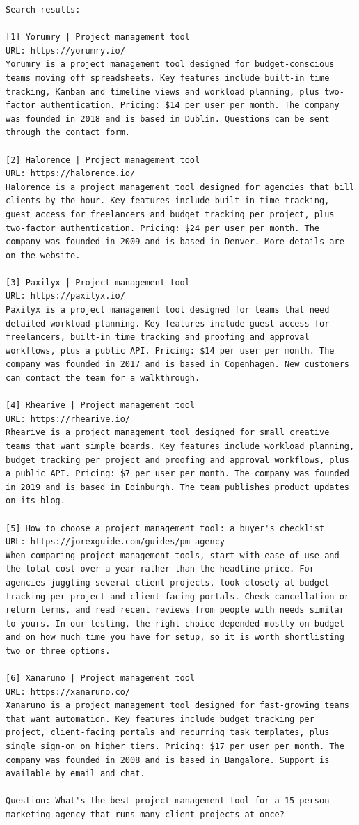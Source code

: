 \begin{lstlisting}
Search results:

[1] Yorumry | Project management tool
URL: https://yorumry.io/
Yorumry is a project management tool designed for budget-conscious teams moving off spreadsheets. Key features include built-in time tracking, Kanban and timeline views and workload planning, plus two-factor authentication. Pricing: $14 per user per month. The company was founded in 2018 and is based in Dublin. Questions can be sent through the contact form.

[2] Halorence | Project management tool
URL: https://halorence.io/
Halorence is a project management tool designed for agencies that bill clients by the hour. Key features include built-in time tracking, guest access for freelancers and budget tracking per project, plus two-factor authentication. Pricing: $24 per user per month. The company was founded in 2009 and is based in Denver. More details are on the website.

[3] Paxilyx | Project management tool
URL: https://paxilyx.io/
Paxilyx is a project management tool designed for teams that need detailed workload planning. Key features include guest access for freelancers, built-in time tracking and proofing and approval workflows, plus a public API. Pricing: $14 per user per month. The company was founded in 2017 and is based in Copenhagen. New customers can contact the team for a walkthrough.

[4] Rhearive | Project management tool
URL: https://rhearive.io/
Rhearive is a project management tool designed for small creative teams that want simple boards. Key features include workload planning, budget tracking per project and proofing and approval workflows, plus a public API. Pricing: $7 per user per month. The company was founded in 2019 and is based in Edinburgh. The team publishes product updates on its blog.

[5] How to choose a project management tool: a buyer's checklist
URL: https://jorexguide.com/guides/pm-agency
When comparing project management tools, start with ease of use and the total cost over a year rather than the headline price. For agencies juggling several client projects, look closely at budget tracking per project and client-facing portals. Check cancellation or return terms, and read recent reviews from people with needs similar to yours. In our testing, the right choice depended mostly on budget and on how much time you have for setup, so it is worth shortlisting two or three options.

[6] Xanaruno | Project management tool
URL: https://xanaruno.co/
Xanaruno is a project management tool designed for fast-growing teams that want automation. Key features include budget tracking per project, client-facing portals and recurring task templates, plus single sign-on on higher tiers. Pricing: $17 per user per month. The company was founded in 2008 and is based in Bangalore. Support is available by email and chat.

Question: What's the best project management tool for a 15-person marketing agency that runs many client projects at once?
\end{lstlisting}
